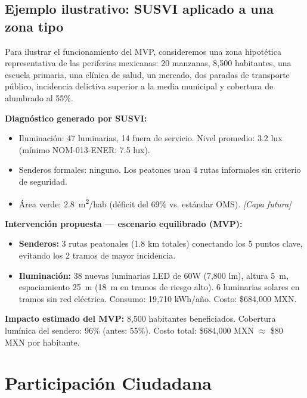 \documentclass[12pt,a4paper]{article}
\begin{document}
\subsection{Ejemplo ilustrativo: SUSVI aplicado a una zona tipo}

Para ilustrar el funcionamiento del MVP, consideremos una zona hipotética representativa de las periferias mexicanas: 20 manzanas, 8{,}500 habitantes, una escuela primaria, una clínica de salud, un mercado, dos paradas de transporte público, incidencia delictiva superior a la media municipal y cobertura de alumbrado al 55\%.

\begin{tcolorbox}[cajagris]
\textbf{Diagnóstico generado por SUSVI:}
\begin{itemize}[leftmargin=0.5cm, itemsep=2pt]
  \item Iluminación: 47 luminarias, 14 fuera de servicio. Nivel promedio: 3.2 lux (mínimo NOM-013-ENER: 7.5 lux).
  \item Senderos formales: ninguno. Los peatones usan 4 rutas informales sin criterio de seguridad.
  \item Área verde: 2.8~m\textsuperscript{2}/hab (déficit del 69\% vs. estándar OMS). \textit{[Capa futura]}
\end{itemize}

\medskip
\textbf{Intervención propuesta — escenario equilibrado (MVP):}
\begin{itemize}[leftmargin=0.5cm, itemsep=2pt]
  \item \textbf{Senderos:} 3 rutas peatonales (1.8 km totales) conectando los 5 puntos clave, evitando los 2 tramos de mayor incidencia.
  \item \textbf{Iluminación:} 38 nuevas luminarias LED de 60W (7{,}800 lm), altura 5~m, espaciamiento 25~m (18~m en tramos de riesgo alto). 6 luminarias solares en tramos sin red eléctrica. Consumo: 19{,}710 kWh/año. Costo: \$684{,}000 MXN.
\end{itemize}

\medskip
\textbf{Impacto estimado del MVP:} 8{,}500 habitantes beneficiados. Cobertura lumínica del sendero: 96\% (antes: 55\%). Costo total: \$684{,}000 MXN $\approx$ \$80 MXN por habitante.
\end{tcolorbox}


\newpage
\section{Participación Ciudadana}
\end{document}
